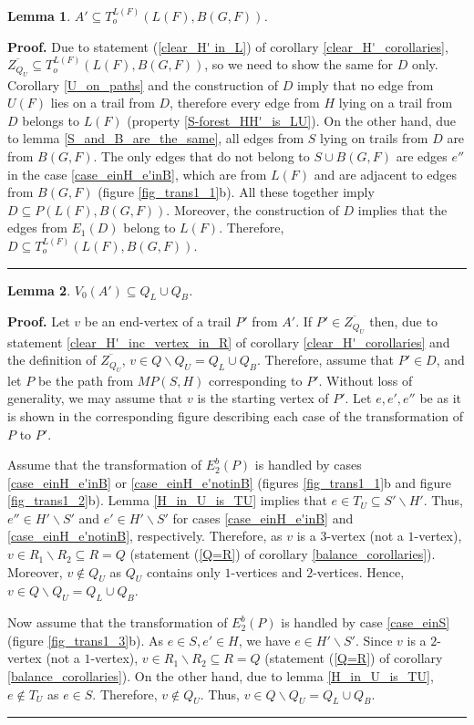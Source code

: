 \documentclass[a4paper, 12pt]{article}
\newtheorem{lemma}{Lemma}[subsection]
\newenvironment{proof}[1][Proof]{\noindent\textbf{#1.} }{\ \rule{0.5em}{0.5em}}
\begin{document}
\begin{lemma} \label{LB_alternating_paths}
$A' \subseteq T_o^{L(F)}(L(F), B(G,F))$.
\end{lemma}
\begin{proof}
Due to statement (\ref{clear_H' in_L}) of corollary
\ref{clear_H'_corollaries}, $\overline{Z_{Q_U}} \subseteq
T_o^{L(F)}(L(F), B(G,F))$, so we need to show the same for $D$ only.
Corollary \ref{U_on_paths} and the construction of $D$ imply that no
edge from $U(F)$ lies on a trail from $D$, therefore every edge from
$H$ lying on a trail from $D$ belongs to $L(F)$ (property
\ref{S-forest_HH'_is_LU}). On the other hand, due to lemma
\ref{S_and_B_are_the_same}, all edges from $S$ lying on trails from
$D$ are from $B(G,F)$. The only edges that do not belong to $S \cup
B(G,F)$ are edges $e''$ in the case \ref{case_einH_e'inB}, which are
from $L(F)$ and are adjacent to edges from $B(G,F)$ (figure
\ref{fig_trans1_1}b). All these together imply $D \subseteq P(L(F),
B(G,F))$. Moreover, the construction of $D$ implies that the edges
from $E_1(D)$ belong to $L(F)$. Therefore, $D \subseteq
T_o^{L(F)}(L(F), B(G,F))$.
\end{proof}

\begin{lemma} \label{endvertices_of_A'_in_Q_LcupQ_B}
$V_0(A') \subseteq Q_L \cup Q_B$.
\end{lemma}
\begin{proof}
Let $v$ be an end-vertex of a trail $P'$ from $A'$. If $P' \in
\overline{Z_{Q_U}}$ then, due to statement
\ref{clear_H'_inc_vertex_in_R} of corollary
\ref{clear_H'_corollaries} and the definition of
$\overline{Z_{Q_U}}$, $v \in Q \backslash Q_U = Q_L \cup Q_B$.
Therefore, assume that $P' \in D$, and let $P$ be the path from
$MP(S,H)$ corresponding to $P'$. Without loss of generality, we may
assume that $v$ is the starting vertex of $P'$. Let $e, e', e''$ be
as it is shown in the corresponding figure describing each case of
the transformation of $P$ to $P'$.

Assume that the transformation of $E_2^b(P)$ is handled by cases
\ref{case_einH_e'inB} or \ref{case_einH_e'notinB} (figures
\ref{fig_trans1_1}b and figure \ref{fig_trans1_2}b). Lemma
\ref{H_in_U_is_TU} implies that $e \in T_U \subseteq S' \backslash
H'$. Thus, $e'' \in H' \backslash S'$ and $e' \in H' \backslash S'$
for cases \ref{case_einH_e'inB} and \ref{case_einH_e'notinB},
respectively. Therefore, as $v$ is a $3$-vertex (not a $1$-vertex),
$v \in R_1 \backslash R_2 \subseteq R = Q$ (statement (\ref{Q=R}) of
corollary \ref{balance_corollaries}). Moreover, $v \notin Q_U$ as
$Q_U$ contains only $1$-vertices and $2$-vertices. Hence, $v \in Q
\backslash Q_U = Q_L \cup Q_B$.

Now assume that the transformation of $E_2^b(P)$ is handled by case
\ref{case_einS} (figure \ref{fig_trans1_3}b). As $e \in S, e' \in
H$, we have $e \in H' \backslash S'$. Since $v$ is a $2$-vertex (not
a $1$-vertex), $v \in R_1 \backslash R_2 \subseteq R = Q$ (statement
(\ref{Q=R}) of corollary \ref{balance_corollaries}). On the other
hand, due to lemma \ref{H_in_U_is_TU}, $e \notin T_U$ as $e \in S$.
Therefore, $v \notin Q_U$. Thus, $v \in Q \backslash Q_U = Q_L \cup
Q_B$.
\end{proof}
\end{document}
